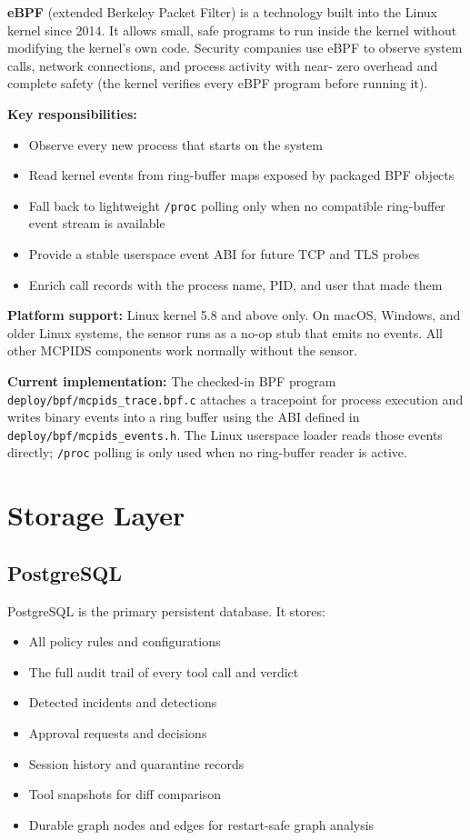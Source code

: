 \documentclass[12pt,a4paper]{report}
\begin{document}
\begin{definitionbox}[eBPF]
\textbf{eBPF} (extended Berkeley Packet Filter) is a technology built into
the Linux kernel since 2014. It allows small, safe programs to run inside the
kernel without modifying the kernel's own code. Security companies use eBPF
to observe system calls, network connections, and process activity with near-
zero overhead and complete safety (the kernel verifies every eBPF program
before running it).
\end{definitionbox}

\textbf{Key responsibilities:}
\begin{itemize}
  \item Observe every new process that starts on the system
  \item Read kernel events from ring-buffer maps exposed by packaged BPF objects
  \item Fall back to lightweight \texttt{/proc} polling only when no compatible ring-buffer
    event stream is available
  \item Provide a stable userspace event ABI for future TCP and TLS probes
  \item Enrich call records with the process name, PID, and user that made them
\end{itemize}

\textbf{Platform support:} Linux kernel 5.8 and above only. On macOS, Windows,
and older Linux systems, the sensor runs as a no-op stub that emits no events.
All other MCPIDS components work normally without the sensor.

\textbf{Current implementation:} The checked-in BPF program
\texttt{deploy/bpf/mcpids\_trace.bpf.c} attaches a tracepoint for process
execution and writes binary events into a ring buffer using the ABI defined in
\texttt{deploy/bpf/mcpids\_events.h}. The Linux userspace loader reads those
events directly; \texttt{/proc} polling is only used when no ring-buffer reader
is active.

\section{Storage Layer}

\subsection{PostgreSQL}

PostgreSQL is the primary persistent database. It stores:
\begin{itemize}
  \item All policy rules and configurations
  \item The full audit trail of every tool call and verdict
  \item Detected incidents and detections
  \item Approval requests and decisions
  \item Session history and quarantine records
  \item Tool snapshots for diff comparison
  \item Durable graph nodes and edges for restart-safe graph analysis
\end{itemize}
\end{document}
